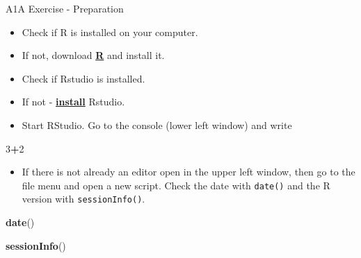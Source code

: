 \documentclass[ignorenonframetext,]{beamer}
\newenvironment{Shaded}{\begin{snugshade}}{\end{snugshade}}
\newcommand{\KeywordTok}[1]{\textcolor[rgb]{0.13,0.29,0.53}{\textbf{#1}}}
\newcommand{\DecValTok}[1]{\textcolor[rgb]{0.00,0.00,0.81}{#1}}
\newcommand{\OperatorTok}[1]{\textcolor[rgb]{0.81,0.36,0.00}{\textbf{#1}}}
\newcommand{\NormalTok}[1]{#1}
\providecommand{\tightlist}{%
  \setlength{\itemsep}{0pt}\setlength{\parskip}{0pt}}
\begin{document}
\begin{frame}[fragile]{A1A Exercise - Preparation}

\begin{itemize}
\tightlist
\item
  Check if R is installed on your computer.
\item
  If not, download \href{r-project.org}{\textbf{R}} and install it.
\item
  Check if Rstudio is installed.
\item
  If not - \href{http://www.rstudio.com/}{\textbf{install}} Rstudio.
\item
  Start RStudio. Go to the console (lower left window) and write
\end{itemize}

\begin{Shaded}
\begin{Highlighting}[]
\DecValTok{3}\OperatorTok{+}\DecValTok{2}
\end{Highlighting}
\end{Shaded}

\begin{itemize}
\tightlist
\item
  If there is not already an editor open in the upper left window, then
  go to the file menu and open a new script. Check the date with
  \texttt{date()} and the R version with \texttt{sessionInfo()}.
\end{itemize}

\begin{Shaded}
\begin{Highlighting}[]
\KeywordTok{date}\NormalTok{()}
\end{Highlighting}
\end{Shaded}

\begin{Shaded}
\begin{Highlighting}[]
\KeywordTok{sessionInfo}\NormalTok{()}
\end{Highlighting}
\end{Shaded}

\end{frame}
\end{document}
